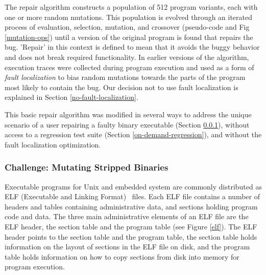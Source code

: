 \documentclass{sigcomm-alternate}
\begin{document}
The repair algorithm constructs a population of 512 program variants,
each with one or more random mutations.  This population is evolved
through an iterated process of evaluation, selection, mutation, and
crossover (pseudo-code and Fig \ref{mutation-ops}) until a version of
the original program is found that repairs the bug.  'Repair' in this
context is defined to mean that it avoids the buggy behavior and does
not break required functionality.  In earlier versions of the
algorithm, execution traces were collected during program execution
and used as a form of \emph{fault localization} to bias random
mutations towards the parts of the program most likely to contain the
bug.  Our decision not to use fault localization is explained in
Section \ref{no-fault-localization}.

This basic repair algorithm was modified in several ways to address
the unique scenario of a user repairing a faulty binary executable
(Section \ref{mutate-mips}), without access to a regression test suite
(Section \ref{on-demand-regression}), and without the fault
localization optimization.

\subsubsection{Challenge: Mutating Stripped Binaries}
\label{mutate-mips}

Executable programs for Unix and embedded system are commonly distributed
as ELF (Executable and Linking Format)~\cite{tis1995tool} files. 
Each ELF file contains a number of headers
and tables containing administrative data, and sections holding
program code and data.  The three main administrative elements of an
ELF file are the ELF header, the section table and the program table
(see Figure \ref{elf}).  The ELF header points to the section table and the
program table, the section table holds information on the layout of
sections in the ELF file on disk, and the program table holds
information on how to copy sections from disk into memory for program
execution.
\end{document}
